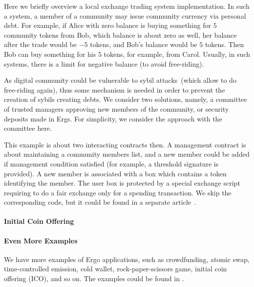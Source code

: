  Here we briefly overview a local exchange trading system implementation. In such a system, a member of a community may
 issue community currency via personal debt. For example, if Alice with zero balance is buying something for $5$
 community tokens from Bob, which balance is about zero as well, her balance after the trade would be $-5$ tokens, and
 Bob's balance would be $5$ tokens. Then Bob can buy something for his $5$ tokens, for example, from Carol.
 Usually, in such systems, there is a limit for negative balance (to avoid free-riding).

 As digital community could be vulnerable to sybil attacks~(which allow to do free-riding again), thus some mechanism
 is needed in order to prevent the creation of sybils creating debts. We consider two solutions, namely, a committee of
 trusted managers approving new members of the community, or security deposits made in Ergs. For simplicity, we
 consider the approach with the committee here.

 This example is about two interacting contracts then. A management contract is about maintaining a
 community members list, and a new member could be added if management condition satisfied  (for example, a threshold
 signature is provided). A new member is associated with a box which contains a token identifying the member. The user
 box is protected by a special exchange script requiring to do a fair exchange only for a spending transaction.
 We skip the corresponding code, but it could be found in a separate article~\cite{icoTutorial}.

\paragraph{Initial Coin Offering}


\paragraph{Even More Examples}

 We have more examples of Ergo applications, such as crowdfunding, atomic swap, time-controlled emission,
 cold wallet, rock-paper-scissors game, initial coin offering (ICO), and so on. The examples could be
 found in \cite{ergoTutorial, ergoAdvTutorial}.